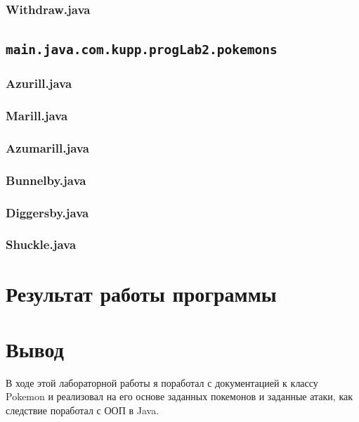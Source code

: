 \documentclass[11pt]{article}
\begin{document}
\subsubsection{Withdraw.java}

\pagebreak
\subsection{\texttt{main.java.com.kupp.progLab2.pokemons}}
\subsubsection{Azurill.java}

\subsubsection{Marill.java}

\subsubsection{Azumarill.java}

\pagebreak
\subsubsection{Bunnelby.java}

\subsubsection{Diggersby.java}

\subsubsection{Shuckle.java}

\section{Результат работы программы}

\large
\section{Вывод}
В ходе этой лабораторной работы я поработал с документацией к классу Pokemon и реализовал на его основе заданных покемонов и заданные атаки, как следствие поработал с ООП в Java.
\end{document}
